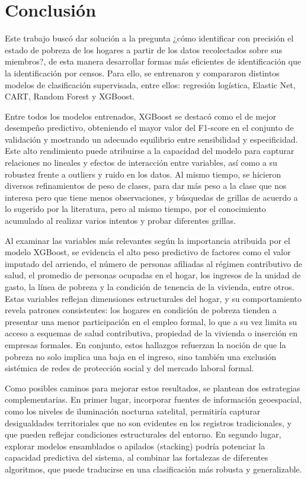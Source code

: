 
\section{Conclusión}




Este trabajo buscó dar solución a la pregunta ¿cómo identificar con precisión el estado de pobreza de los hogares a partir de los datos recolectados sobre sus miembros?, de esta manera desarrollar formas más eficientes de identificación que la identificación por censos. Para ello, se entrenaron y compararon distintos modelos de clasificación supervisada, entre ellos: regresión logística,  Elastic Net, CART,  Random Forest y XGBoost.

Entre todos los modelos entrenados, XGBoost se destacó como el de mejor desempeño predictivo, obteniendo el mayor valor del F1-score en el conjunto de validación y mostrando un adecuado equilibrio entre sensibilidad y especificidad. Este alto rendimiento puede atribuirse a la capacidad del modelo para capturar relaciones no lineales y efectos de interacción entre variables, así como a su robustez frente a outliers y ruido en los datos. Al mismo tiempo, se hicieron diversos refinamientos de peso de clases, para dar más peso a la clase que nos interesa pero que tiene menos observaciones, y búsquedas de grillas de acuerdo a lo sugerido por la literatura, pero al mismo tiempo, por el conocimiento acumulado al realizar varios intentos y probar diferentes grillas. 

Al examinar las variables más relevantes según la importancia atribuida por el modelo XGBoost, se evidencia el alto peso predictivo de factores como el valor imputado del arriendo, el número de personas afiliadas al régimen contributivo de salud, el promedio de personas ocupadas en el hogar, los ingresos de la unidad de gasto, la línea de pobreza y la condición de tenencia de la vivienda, entre otros. Estas variables reflejan dimensiones estructurales del hogar, y su comportamiento revela patrones consistentes: los hogares en condición de pobreza tienden a presentar una menor participación en el empleo formal, lo que a su vez limita su acceso a esquemas de salud contributiva, propiedad de la vivienda o inserción en empresas formales. En conjunto, estos hallazgos refuerzan la noción de que la pobreza no solo implica una baja en el ingreso, sino también una exclusión sistémica de redes de protección social y del mercado laboral formal.

Como posibles caminos para mejorar estos resultados, se plantean dos estrategias complementarias. En primer lugar, incorporar fuentes de información geoespacial, como los niveles de iluminación nocturna satelital, permitiría capturar desigualdades territoriales que no son evidentes en los registros tradicionales, y que pueden reflejar condiciones estructurales del entorno. En segundo lugar, explorar modelos ensamblados o apilados (stacking) podría potenciar la capacidad predictiva del sistema, al combinar las fortalezas de diferentes algoritmos, que puede traducirse en una clasificación más robusta y generalizable.
